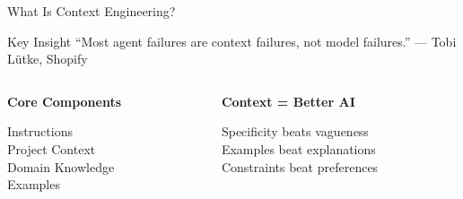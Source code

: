 \documentclass[aspectratio=169]{beamer}
\begin{document}
\begin{frame}{What Is Context Engineering?}
  \begin{block}{Key Insight \cite{lutke2024context}}
    ``Most agent failures are context failures, not model failures.'' --- Tobi Lütke, Shopify
  \end{block}

  \vspace{0.5cm}

  \begin{columns}[T]
    \begin{column}{0.48\textwidth}
      \centering
      \large\bfseries
      Core Components

      \vspace{0.3cm}
      \normalsize
      Instructions\\
      Project Context\\
      Domain Knowledge\\
      Examples
    \end{column}
    \begin{column}{0.48\textwidth}
      \centering
      \large\bfseries
      Context = Better AI

      \vspace{0.3cm}
      \normalsize
      Specificity beats vagueness\\
      Examples beat explanations\\
      Constraints beat preferences
    \end{column}
  \end{columns}
\end{frame}
\end{document}
